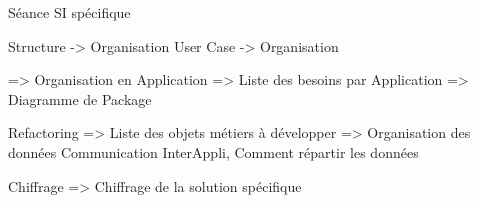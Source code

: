 Séance SI spécifique

Structure -> Organisation
User Case -> Organisation

=> Organisation en Application
=> Liste des besoins par Application
=> Diagramme de Package

Refactoring
=> Liste des objets métiers à développer
=> Organisation des données {Communication InterAppli, Comment répartir les données}

Chiffrage
=> Chiffrage de la solution spécifique
